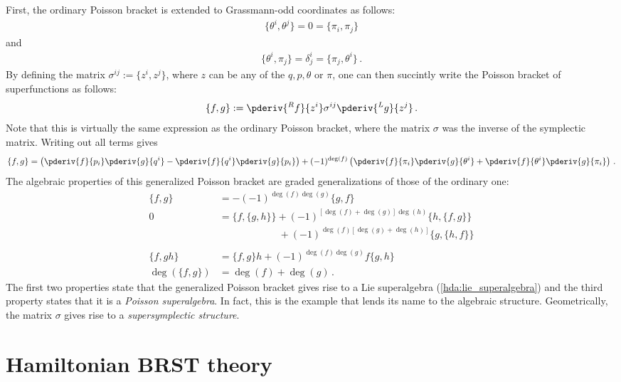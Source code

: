     First, the ordinary Poisson bracket is extended to Grassmann-odd coordinates as follows:
    \begin{gather}
        \{\theta^i,\theta^j\} = 0 = \{\pi_i,\pi_j\}
    \end{gather}
    and
    \begin{gather}
        \{\theta^i,\pi_j\} = \delta^i_j = \{\pi_j,\theta^i\}\,.
    \end{gather}
    By defining the matrix $\sigma^{ij} := \{z^i,z^j\}$, where $z$ can be any of the $q,p,\theta$ or $\pi$, one can then succintly write the Poisson bracket of superfunctions as follows:
    \begin{gather}
        \{f,g\} := \pderiv{^Rf}{z^i}\sigma^{ij}\pderiv{^Lg}{z^j}\,.
    \end{gather}
    Note that this is virtually the same expression as the ordinary Poisson bracket, where the matrix $\sigma$ was the inverse of the symplectic matrix. Writing out all terms gives
    \begin{gather}
        \{f,g\} = \left(\pderiv{f}{p_i}\pderiv{g}{q^i}-\pderiv{f}{q^i}\pderiv{g}{p_i}\right) + (-1)^{\deg(f)}\left(\pderiv{f}{\pi_i}\pderiv{g}{\theta^i} + \pderiv{f}{\theta^i}\pderiv{g}{\pi_i}\right)\,.
    \end{gather}
    The algebraic properties of this generalized Poisson bracket are graded generalizations of those of the ordinary one:
    \begin{align}
        \{f,g\} &= -(-1)^{\deg(f)\deg(g)}\{g,f\}\\
        0 &= \{f,\{g,h\}\} + (-1)^{[\deg(f)+\deg(g)]\deg(h)}\{h,\{f,g\}\}\nonumber\\
        &\ \phantom{= \{f,\{g,h\}\} } + (-1)^{\deg(f)[\deg(g)+\deg(h)]}\{g,\{h,f\}\}\\\nonumber\\
        \{f,gh\} &= \{f,g\}h + (-1)^{\deg(f)\deg(g)}f\{g,h\}\\
        \deg(\{f,g\}) &= \deg(f)+\deg(g)\,.
    \end{align}
    The first two properties state that the generalized Poisson bracket gives rise to a Lie superalgebra (\cref{hda:lie_superalgebra}) and the third property states that it is a \textit{Poisson superalgebra}. In fact, this is the example that lends its name to the algebraic structure. Geometrically, the matrix $\sigma$ gives rise to a \textit{supersymplectic structure}.

\section{Hamiltonian BRST theory}\label{section:classical_brst}
